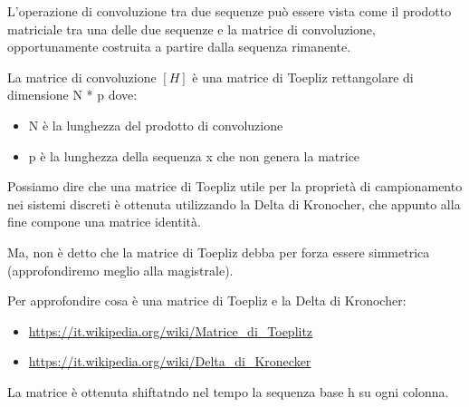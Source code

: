L'operazione di convoluzione tra due sequenze può essere vista come il prodotto matriciale tra una delle due sequenze e la matrice di convoluzione, opportunamente costruita a partire dalla sequenza rimanente. \newline 

La matrice di convoluzione $\left[ H\right]$ è una matrice di Toepliz rettangolare di dimensione N * p dove: 

\begin{itemize}
    \item N è la lunghezza del prodotto di convoluzione 
    \item p è la lunghezza della sequenza x che non genera la matrice 
\end{itemize}

\begin{tcolorbox}

Possiamo dire che una matrice di Toepliz utile per la proprietà di campionamento nei sistemi discreti 
è ottenuta utilizzando la Delta di Kronocher, 
che appunto alla fine compone una matrice identità. \newline 

Ma, non è detto che la matrice di Toepliz debba per forza essere simmetrica (approfondiremo meglio alla magistrale). \newline 

Per approfondire cosa è una matrice di Toepliz e la Delta di Kronocher: 

\begin{itemize}
    \item \url{https://it.wikipedia.org/wiki/Matrice_di_Toeplitz} 
    \item \url{https://it.wikipedia.org/wiki/Delta_di_Kronecker}
\end{itemize}

\end{tcolorbox}

La matrice è ottenuta shiftatndo nel tempo la sequenza base h su ogni colonna. \newline 


